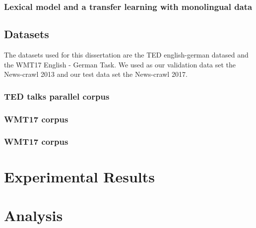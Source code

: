 \subsubsection{Lexical model and a transfer learning with monolingual data}

\subsection{Datasets} \label{sec:datasets}

The datasets used for this dissertation are the TED english-german datased and the WMT17 English - German Task. We used as our validation data set the News-crawl 2013 and our test data set the News-crawl 2017.

\subsubsection{TED talks parallel corpus}

\subsubsection{WMT17 corpus}

\subsubsection{WMT17 corpus} \citep*{bojar2017d1}

\section{Experimental Results}


\section{Analysis}